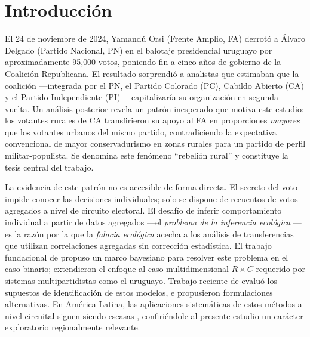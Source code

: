 
\section{Introducción}
\label{sec:introduccion}

El 24 de noviembre de 2024, Yamandú Orsi (Frente Amplio, FA) derrotó a Álvaro Delgado (Partido Nacional, PN) en el balotaje presidencial uruguayo por aproximadamente 95{,}000 votos, poniendo fin a cinco años de gobierno de la Coalición Republicana. El resultado sorprendió a analistas que estimaban que la coalición ---integrada por el PN, el Partido Colorado (PC), Cabildo Abierto (CA) y el Partido Independiente (PI)--- capitalizaría su organización en segunda vuelta. Un análisis posterior revela un patrón inesperado que motiva este estudio: los votantes rurales de CA transfirieron su apoyo al FA en proporciones \textit{mayores} que los votantes urbanos del mismo partido, contradiciendo la expectativa convencional de mayor conservadurismo en zonas rurales para un partido de perfil militar-populista. Se denomina este fenómeno ``rebelión rural'' y constituye la tesis central del trabajo.

La evidencia de este patrón no es accesible de forma directa. El secreto del voto impide conocer las decisiones individuales; solo se dispone de recuentos de votos agregados a nivel de circuito electoral. El desafío de inferir comportamiento individual a partir de datos agregados ---el \textit{problema de la inferencia ecológica} \citep{king1997}--- es la razón por la que la \textit{falacia ecológica} \citep{robinson1950ecological} acecha a los análisis de transferencias que utilizan correlaciones agregadas sin corrección estadística. El trabajo fundacional de \citet{king1997} propuso un marco bayesiano para resolver este problema en el caso binario; \citet{rosen2001bayesian} extendieron el enfoque al caso multidimensional $R \times C$ requerido por sistemas multipartidistas como el uruguayo. Trabajo reciente de \citet{greiner2009rxc} evaluó los supuestos de identificación de estos modelos, e \citet{imai2008bayesian} propusieron formulaciones alternativas. En América Latina, las aplicaciones sistemáticas de estos métodos a nivel circuital siguen siendo escasas \citep{calvo2003local}, confiriéndole al presente estudio un carácter exploratorio regionalmente relevante.

